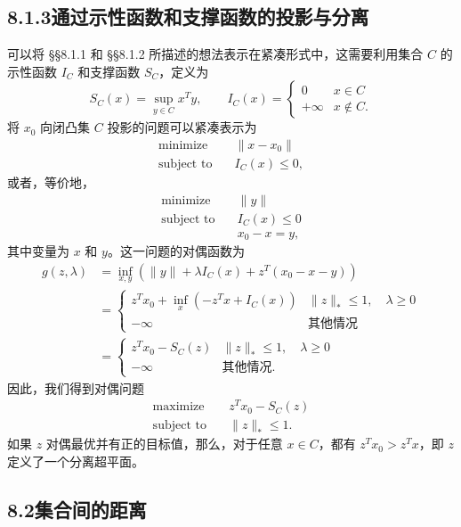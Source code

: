 \documentclass[UTF8,12pt,a4paper,fontset=fandol]{ctexart}
\begin{document}
\subsection*{8.1.3\quad 通过示性函数和支撑函数的投影与分离}

可以将 \S\S 8.1.1 和 \S\S 8.1.2 所描述的想法表示在紧凑形式中，这需要利用集合 $C$ 的示性函数 $I_C$ 和支撑函数 $S_C$，定义为
\[
S_C(x)=\sup_{y\in C}x^Ty,\qquad
I_C(x)=
\begin{cases}
0 & x\in C\\
+\infty & x\notin C.
\end{cases}
\]
将 $x_0$ 向闭凸集 $C$ 投影的问题可以紧凑表示为
\[
\begin{aligned}
\text{minimize}\quad & \|x-x_0\|\\
\text{subject to}\quad & I_C(x)\leq 0,
\end{aligned}
\]
或者，等价地，
\[
\begin{aligned}
\text{minimize}\quad & \|y\|\\
\text{subject to}\quad & I_C(x)\leq 0\\
& x_0-x=y,
\end{aligned}
\]
其中变量为 $x$ 和 $y$。这一问题的对偶函数为
\[
\begin{aligned}
g(z,\lambda)
&=\inf_{x,y}\left(\|y\|+\lambda I_C(x)+z^T(x_0-x-y)\right)\\
&=
\begin{cases}
z^Tx_0+\inf_x(-z^Tx+I_C(x)) & \|z\|_\ast\leq 1,\quad \lambda\geq 0\\
-\infty & \text{其他情况}
\end{cases}\\
&=
\begin{cases}
z^Tx_0-S_C(z) & \|z\|_\ast\leq 1,\quad \lambda\geq 0\\
-\infty & \text{其他情况}.
\end{cases}
\end{aligned}
\]
因此，我们得到对偶问题
\[
\begin{aligned}
\text{maximize}\quad & z^Tx_0-S_C(z)\\
\text{subject to}\quad & \|z\|_\ast\leq 1.
\end{aligned}
\]
如果 $z$ 对偶最优并有正的目标值，那么，对于任意 $x\in C$，都有 $z^Tx_0>z^Tx$，即 $z$ 定义了一个分离超平面。

\subsection*{8.2\quad 集合间的距离}
\end{document}
